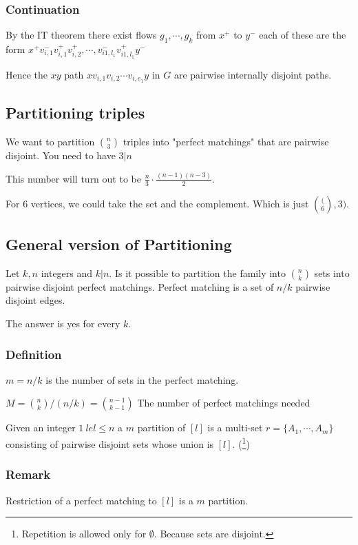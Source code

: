 \documentclass[11pt]{article}
\begin{document}
{\subsubsection{Continuation}
\label{sec:org30b55fb}
By the IT theorem there exist flows \(g_1, \cdots, g_k\) from \(x^+\) to \(y^-\)
each of these are the form \(x^+v_{i,1}^-v_{i,1}^+v_{i, 2}^+, \cdots,
    v_{i1,l_1}^-v_{i1,l_1}^+y^-\)

Hence the \(xy\) path \(xv_{i, 1}v_{i, 2} \cdots v_{i, e_1}y\) in \(G\) are
pairwise internally disjoint paths.
\subsection{Partitioning triples}
\label{sec:orga3258d2}
We want to partition \(\binom{n}{3}\) triples into "perfect matchings" that are
pairwise disjoint. You need to have \(3 \vert n\)

This number will turn out to be \(\frac{n}{3} \cdot \frac{(n-1)(n-3)}{2}\).

For \(6\) vertices, we could take the set and the complement. Which is just
\(\binom(6, 3)\).
\subsection{General version of Partitioning}
\label{sec:orgd0518cc}
Let \(k, n\) integers and \(k\vert n\). Is it possible to partition the family
into \(\binom{n}{k}\) sets into pairwise disjoint perfect matchings. Perfect
matching is a set of \(n/k\) pairwise disjoint edges.

The answer is yes for every \(k\).
\subsubsection{Definition}
\label{sec:org754ed03}
\(m = n/k\) is the number of sets in the perfect matching.

\(M = \binom{n}{k}/(n/k) = \binom{n-1}{k-1}\) The number of perfect matchings needed

Given an integer \(1\ le l \le n\) a \(m\) partition of \([l]\) is a multi-set \(r
    = \{A_1, \cdots, A_m\}\) consisting of pairwise disjoint sets whose union is
\([l]\). (\footnote{Repetition is allowed only for \(\emptyset\). Because sets are disjoint.})
\subsubsection{Remark}
\label{sec:orgf892ef8}
Restriction of a perfect matching to \([l]\) is a \(m\) partition.
}
\end{document}
